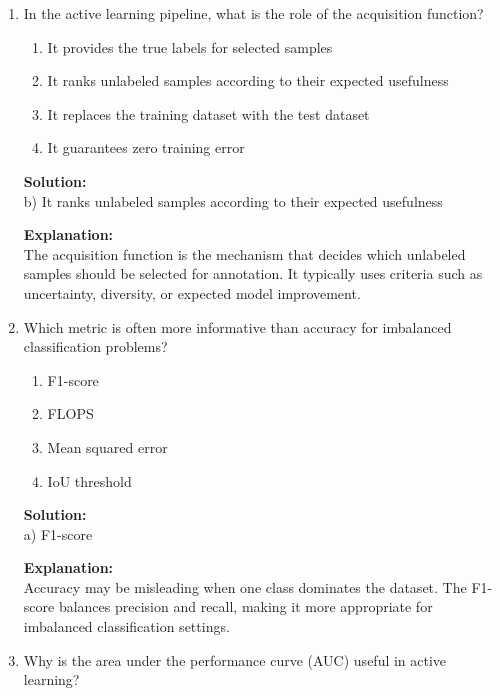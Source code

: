 \documentclass{article}
\begin{document}
\begin{enumerate}
\vspace{1em}

\item In the active learning pipeline, what is the role of the acquisition function?

\begin{enumerate}
    \item It provides the true labels for selected samples
    \item It ranks unlabeled samples according to their expected usefulness
    \item It replaces the training dataset with the test dataset
    \item It guarantees zero training error
\end{enumerate}

\textbf{Solution:} \\
b) It ranks unlabeled samples according to their expected usefulness

\textbf{Explanation:} \\
The acquisition function is the mechanism that decides which unlabeled samples should be selected for annotation. It typically uses criteria such as uncertainty, diversity, or expected model improvement.

\vspace{1em}

\item Which metric is often more informative than accuracy for imbalanced classification problems?

\begin{enumerate}
    \item F1-score
    \item FLOPS
    \item Mean squared error
    \item IoU threshold
\end{enumerate}

\textbf{Solution:} \\
a) F1-score

\textbf{Explanation:} \\
Accuracy may be misleading when one class dominates the dataset. The F1-score balances precision and recall, making it more appropriate for imbalanced classification settings.

\vspace{1em}

\item Why is the area under the performance curve (AUC) useful in active learning?


\end{enumerate}
\end{document}

